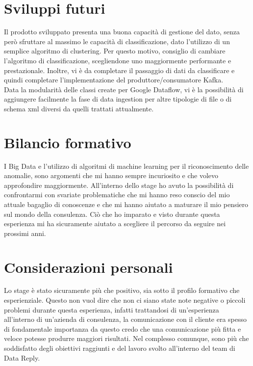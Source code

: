 \section{Sviluppi futuri}
Il prodotto sviluppato presenta una buona capacità di gestione del dato, senza però sfruttare al massimo le capacità di classificazione, dato l'utilizzo di un semplice algoritmo di clustering. Per questo motivo, consiglio di cambiare l'algoritmo di classificazione, scegliendone uno maggiormente performante e prestazionale. Inoltre, vi è da completare il passaggio di dati da classificare e quindi completare l'implementazione del produttore/consumatore Kafka.
\\
Data la modularità delle classi create per Google Dataflow, vi è la possibilità di aggiungere facilmente la fase di data ingestion per altre tipologie di file o di schema xml diversi da quelli trattati attualmente.
\section{Bilancio formativo}
I Big Data e l'utilizzo di algoritmi di machine learning per il riconoscimento delle anomalie, sono argomenti che mi hanno sempre incuriosito e che volevo approfondire maggiormente. All'interno dello stage ho avuto la possibilità di confrontarmi con svariate problematiche che mi hanno reso conscio del mio attuale bagaglio di conoscenze e che mi hanno aiutato a maturare il mio pensiero sul mondo della consulenza.
Ciò che ho imparato e visto durante questa esperienza mi ha sicuramente aiutato a scegliere il percorso da seguire nei prossimi anni.
\section{Considerazioni personali}
Lo stage è stato sicuramente più che positivo, sia sotto il profilo formativo che esperienziale. Questo non vuol dire che non ci siano state note negative o piccoli problemi durante questa esperienza, infatti trattandosi di un'esperienza all'interno di un'azienda di consulenza, la comunicazione con il cliente era spesso di fondamentale importanza da questo credo che una comunicazione più fitta e veloce potesse produrre maggiori risultati. 
Nel complesso comunque, sono più che soddisfatto degli obiettivi raggiunti e del lavoro svolto all'interno del team di Data Reply.